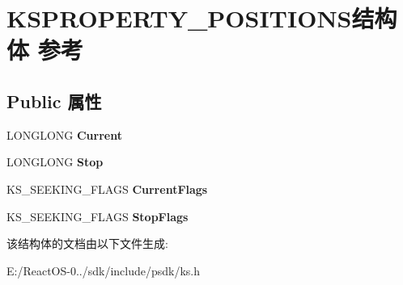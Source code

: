 \hypertarget{struct_k_s_p_r_o_p_e_r_t_y___p_o_s_i_t_i_o_n_s}{}\section{K\+S\+P\+R\+O\+P\+E\+R\+T\+Y\+\_\+\+P\+O\+S\+I\+T\+I\+O\+N\+S结构体 参考}
\label{struct_k_s_p_r_o_p_e_r_t_y___p_o_s_i_t_i_o_n_s}
\subsection*{Public 属性}
\begin{DoxyCompactItemize}
\item 
\mbox{\label{struct_k_s_p_r_o_p_e_r_t_y___p_o_s_i_t_i_o_n_s_a27c7bb9aa752f141cfc7c39f494b36bb}} 
L\+O\+N\+G\+L\+O\+NG {\bfseries Current}
\item 
\mbox{\label{struct_k_s_p_r_o_p_e_r_t_y___p_o_s_i_t_i_o_n_s_a80c5e691f55fd4926af7b2924f2e8b0e}} 
L\+O\+N\+G\+L\+O\+NG {\bfseries Stop}
\item 
\mbox{\label{struct_k_s_p_r_o_p_e_r_t_y___p_o_s_i_t_i_o_n_s_afbad5c10f545d827da9597ed22ad8c2d}} 
K\+S\+\_\+\+S\+E\+E\+K\+I\+N\+G\+\_\+\+F\+L\+A\+GS {\bfseries Current\+Flags}
\item 
\mbox{\label{struct_k_s_p_r_o_p_e_r_t_y___p_o_s_i_t_i_o_n_s_ae2d7844ea91228b76bcf272a0be2607a}} 
K\+S\+\_\+\+S\+E\+E\+K\+I\+N\+G\+\_\+\+F\+L\+A\+GS {\bfseries Stop\+Flags}
\end{DoxyCompactItemize}


该结构体的文档由以下文件生成\+:\begin{DoxyCompactItemize}
\item 
E\+:/\+React\+O\+S-\/0../sdk/include/psdk/ks.\+h\end{DoxyCompactItemize}
